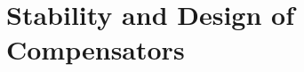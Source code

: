 \documentclass[../course]{subfiles}
\begin{document}
\chapter{Stability and Design of Compensators}


\end{document}
